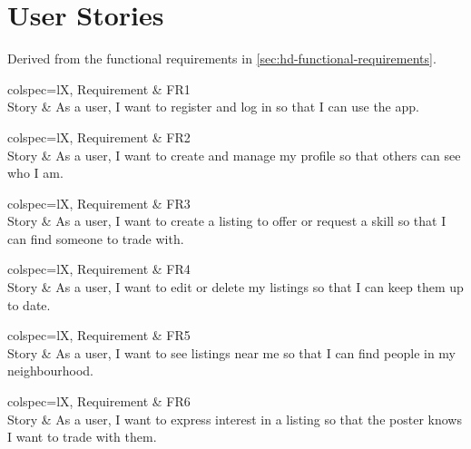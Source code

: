 \section{User Stories}\label{sec:hd-user-stories}
Derived from the functional requirements in \cref{sec:hd-functional-requirements}.

\begin{htable}[
    caption = {User story 1},
]
    {
        colspec={lX},
    }
        Requirement & FR1 \\
        Story & As a user, I want to register and log in so that I can use the app. \\
\end{htable}

\begin{htable}[
    caption = {User story 2},
]
    {
        colspec={lX},
    }
        Requirement & FR2 \\
        Story & As a user, I want to create and manage my profile so that others can see who I am. \\
\end{htable}

\begin{htable}[
    caption = {User story 3},
]
    {
        colspec={lX},
    }
        Requirement & FR3 \\
        Story & As a user, I want to create a listing to offer or request a skill so that I can find someone to trade with. \\
\end{htable}

\begin{htable}[
    caption = {User story 4},
]
    {
        colspec={lX},
    }
        Requirement & FR4 \\
        Story & As a user, I want to edit or delete my listings so that I can keep them up to date. \\
\end{htable}

\begin{htable}[
    caption = {User story 5},
]
    {
        colspec={lX},
    }
        Requirement & FR5 \\
        Story & As a user, I want to see listings near me so that I can find people in my neighbourhood. \\
\end{htable}

\begin{htable}[
    caption = {User story 6},
]
    {
        colspec={lX},
    }
        Requirement & FR6 \\
        Story & As a user, I want to express interest in a listing so that the poster knows I want to trade with them. \\
\end{htable}

